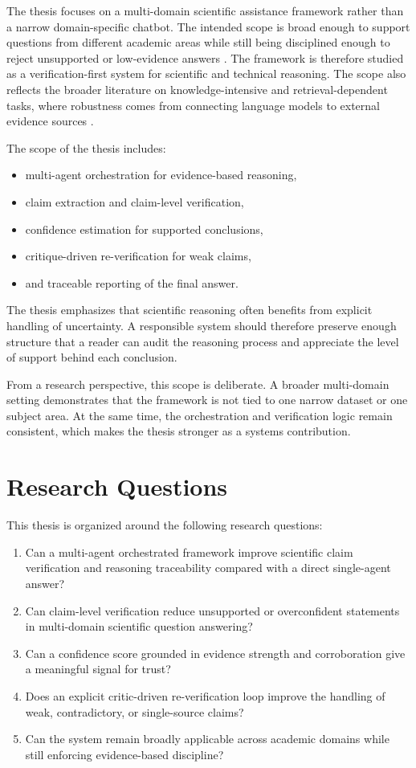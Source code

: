 The thesis focuses on a multi-domain scientific assistance framework rather than a narrow domain-specific chatbot. The intended scope is broad enough to support questions from different academic areas while still being disciplined enough to reject unsupported or low-evidence answers \cite{petroni2020kilt,thakur2021beir}. The framework is therefore studied as a verification-first system for scientific and technical reasoning.
The scope also reflects the broader literature on knowledge-intensive and retrieval-dependent tasks, where robustness comes from connecting language models to external evidence sources \cite{guu2020realm,karpukhin2020dpr,khattab2020colbert}.

The scope of the thesis includes:
\begin{itemize}[leftmargin=*]
    \item multi-agent orchestration for evidence-based reasoning,
    \item claim extraction and claim-level verification,
    \item confidence estimation for supported conclusions,
    \item critique-driven re-verification for weak claims,
    \item and traceable reporting of the final answer.
\end{itemize}

The thesis emphasizes that scientific reasoning often benefits from explicit handling of uncertainty. A responsible system should therefore preserve enough structure that a reader can audit the reasoning process and appreciate the level of support behind each conclusion.

From a research perspective, this scope is deliberate. A broader multi-domain setting demonstrates that the framework is not tied to one narrow dataset or one subject area. At the same time, the orchestration and verification logic remain consistent, which makes the thesis stronger as a systems contribution.

\section{Research Questions}

This thesis is organized around the following research questions:
\begin{enumerate}
    \item Can a multi-agent orchestrated framework improve scientific claim verification and reasoning traceability compared with a direct single-agent answer?
    \item Can claim-level verification reduce unsupported or overconfident statements in multi-domain scientific question answering?
    \item Can a confidence score grounded in evidence strength and corroboration give a meaningful signal for trust?
    \item Does an explicit critic-driven re-verification loop improve the handling of weak, contradictory, or single-source claims?
    \item Can the system remain broadly applicable across academic domains while still enforcing evidence-based discipline?
\end{enumerate}

